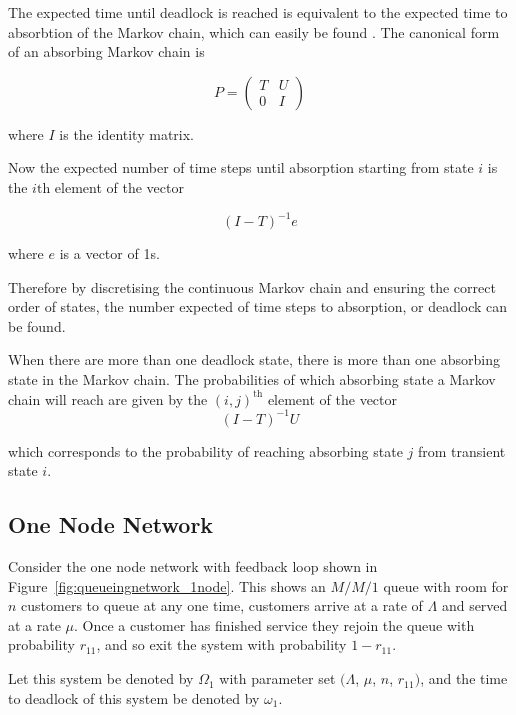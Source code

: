 \documentclass{article}
\begin{document}
The expected time until deadlock is reached is equivalent to the expected time to absorbtion of the Markov chain, which can easily be found \cite{stewart09}.
The canonical form of an absorbing Markov chain is

\begin{equation*}
P = \left(\begin{matrix} T & U\\ 0 & I \end{matrix} \right)
\end{equation*}

where $I$ is the identity matrix.

Now the expected number of time steps until absorption starting from state $i$ is the $i\text{th}$ element of the vector

\begin{equation}
  (I - T)^{-1}e
\end{equation}

where $e$ is a vector of 1s.

Therefore by discretising the continuous Markov chain and ensuring the correct order of states, the number expected of time steps to absorption, or deadlock can be found.

When there are more than one deadlock state, there is more than one absorbing state in the Markov chain.
The probabilities of which absorbing state a Markov chain will reach are given by the $(i, j)^{\text{th}}$ element of the vector
\begin{equation}
  (I - T)^{-1}U
\end{equation}

which corresponds to the probability of reaching absorbing state $j$ from transient state $i$.

\subsection{One Node Network}\label{sec:1nodenet}
Consider the one node network with feedback loop shown in Figure~\ref{fig:queueingnetwork_1node}.
This shows an \(M/M/1\) queue with room for $n$ customers to queue at any one time, customers arrive at a rate of $\Lambda$ and served at a rate $\mu$.
Once a customer has finished service they rejoin the queue with probability $r_{11}$, and so exit the system with probability $1 - r_{11}$.

Let this system be denoted by $\Omega_1$ with parameter set $(\Lambda$, $\mu$, $n$, $r_{11})$, and the time to deadlock of this system be denoted by $\omega_1$.
\end{document}
